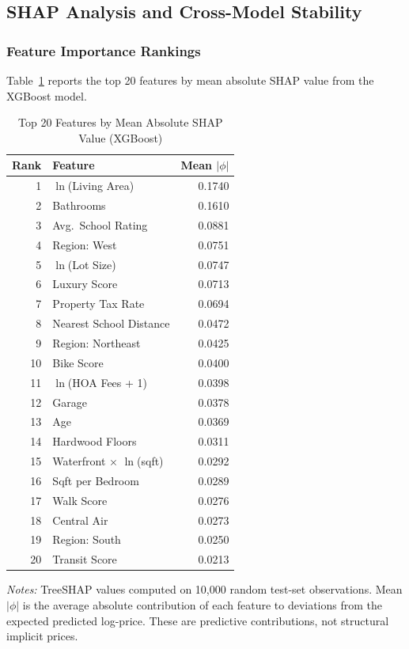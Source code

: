 \subsection{SHAP Analysis and Cross-Model Stability}
\label{sec:shap_results}

\subsubsection{Feature Importance Rankings}

Table~\ref{tab:shap_importance} reports the top 20 features by mean absolute SHAP value from the XGBoost model.

\begin{table}[H]
\centering
\caption{Top 20 Features by Mean Absolute SHAP Value (XGBoost)}
\label{tab:shap_importance}
\begin{threeparttable}
\begin{tabular}{rlr}
\toprule
Rank & Feature & Mean $|\phi|$ \\
\midrule
1 & $\ln$(Living Area) & 0.1740 \\
2 & Bathrooms & 0.1610 \\
3 & Avg.\ School Rating & 0.0881 \\
4 & Region: West & 0.0751 \\
5 & $\ln$(Lot Size) & 0.0747 \\
6 & Luxury Score & 0.0713 \\
7 & Property Tax Rate & 0.0694 \\
8 & Nearest School Distance & 0.0472 \\
9 & Region: Northeast & 0.0425 \\
10 & Bike Score & 0.0400 \\
11 & $\ln$(HOA Fees + 1) & 0.0398 \\
12 & Garage & 0.0378 \\
13 & Age & 0.0369 \\
14 & Hardwood Floors & 0.0311 \\
15 & Waterfront $\times$ $\ln$(sqft) & 0.0292 \\
16 & Sqft per Bedroom & 0.0289 \\
17 & Walk Score & 0.0276 \\
18 & Central Air & 0.0273 \\
19 & Region: South & 0.0250 \\
20 & Transit Score & 0.0213 \\
\bottomrule
\end{tabular}
\begin{tablenotes}
\small
\item \textit{Notes:} TreeSHAP values computed on 10,000 random test-set observations. Mean $|\phi|$ is the average absolute contribution of each feature to deviations from the expected predicted log-price. These are predictive contributions, not structural implicit prices.
\end{tablenotes}
\end{threeparttable}
\end{table}


